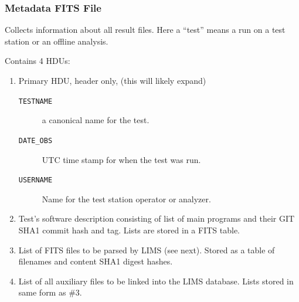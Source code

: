 \documentclass[xcolor=dvipsnames]{beamer}
\begin{document}
\begin{frame}
  \frametitle{Metadata FITS File} 

  Collects information about all result files.  Here a ``test'' means
  a run on a test station or an offline analysis.  

  Contains 4 HDUs:

  \begin{enumerate}
  \item Primary HDU, header only, (this will likely expand)
    \begin{description}
    \item[\texttt{TESTNAME}] a canonical name for the test.
    \item[\texttt{DATE\_OBS}] UTC time stamp for when the test was run.
    \item[\texttt{USERNAME}] Name for the test station operator or analyzer.
    \end{description}
  \item Test's software description consisting of list of main
    programs and their GIT SHA1 commit hash and tag.  Lists are stored
    in a FITS table.
  \item List of FITS files to be parsed by LIMS (see next).  Stored as
    a table of filenames and content SHA1 digest hashes.
  \item List of all auxiliary files to be linked into the LIMS
    database.  Lists stored in same form as \#3.
  \end{enumerate}

\end{frame}
\end{document}
